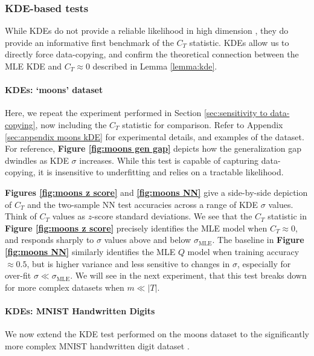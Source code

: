 \subsubsection{KDE-based tests}
\label{sec:KDE experiments}
 While KDEs do not provide a reliable likelihood in high dimension \citep{theis}, they do provide an informative first benchmark of the $C_T$ statistic. KDEs allow us to directly force data-copying, and confirm the theoretical connection between the MLE KDE and $C_T \approx 0$ described in Lemma \ref{lemma:kde}.

\paragraph{KDEs: `moons' dataset}

Here, we repeat the experiment performed in Section \ref{sec:sensitivity to data-copying}, now including the $C_T$ statistic for comparison. Refer to Appendix \ref{sec:appendix moons kDE} for experimental details, and examples of the dataset. For reference, \textbf{Figure \ref{fig:moons gen gap}} depicts how the generalization gap dwindles as KDE $\sigma$ increases. While this test is capable of capturing data-copying, it is insensitive to underfitting and relies on a tractable likelihood.

\textbf{Figures \ref{fig:moons z score}} and \textbf{ \ref{fig:moons NN}} give a side-by-side depiction of $C_T$ and the two-sample NN test accuracies across a range of KDE $\sigma$ values. Think of $C_T$ values as $z$-score standard deviations. We see that the $C_T$ statistic in \textbf{Figure \ref{fig:moons z score}} precisely identifies the MLE model when $C_T \approx 0$, and responds sharply to $\sigma$ values above and below $\sigma_{\text{MLE}}$. The baseline in \textbf{Figure \ref{fig:moons NN}} similarly identifies the MLE $Q$ model when training accuracy $\approx 0.5$, but is higher variance and less sensitive to changes in $\sigma$, especially for over-fit $\sigma \ll \sigma_{\text{MLE}}$. We will see in the next experiment, that this test breaks down for more complex datasets when $m \ll |T|$. 

\paragraph{KDEs: MNIST Handwritten Digits}
\label{sec:MNIST KDE}
We now extend the KDE test performed on the moons dataset to the significantly more complex MNIST handwritten digit dataset \citep{lecun}. 

